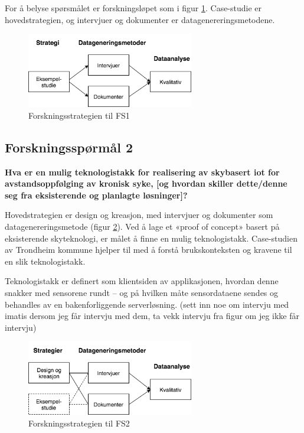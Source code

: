 For å belyse spørsmålet er forskningsløpet som i figur \ref{fig:oates_fs1}. Case-studie er hovedstrategien, og intervjuer og dokumenter
er datagenereringsmetodene.

\begin{figure}
\centering
\includegraphics[width=0.65\textwidth]{fig/oates/fs1}
\caption{Forskningsstrategien til FS1}
\label{fig:oates_fs1}
\end{figure}

\subsection{Forskningsspørmål 2}
\textbf{Hva er en mulig teknologistakk for realisering av skybasert \gls{iot} for avstandsoppfølging av kronisk syke,
    [og hvordan skiller dette/denne seg fra eksisterende og planlagte løsninger]?}

Hovedstrategien er design og kreasjon, med intervjuer og dokumenter som datagenereringsmetode (figur \ref{fig:oates_fs2}). Ved å lage
et «proof of concept» basert på eksisterende skyteknologi, er målet å finne en mulig teknologistakk. Case-studien av Trondheim
kommune hjelper til med å forstå brukskonteksten og kravene til en slik teknologistakk.

Teknologistakk er definert
som klientsiden av applikasjonen, hvordan denne snakker med sensorene rundt -- og på hvilken måte sensordataene sendes og behandles av
en bakenforliggende serverløsning.
(sett inn noe om intervju med imatis dersom jeg får intervju med dem, ta vekk intervju fra figur om jeg ikke får intervju)

\begin{figure}
\centering
\includegraphics[width=0.65\textwidth]{fig/oates/fs2}
\caption{Forskningsstrategien til FS2}
\label{fig:oates_fs2}
\end{figure}
    
